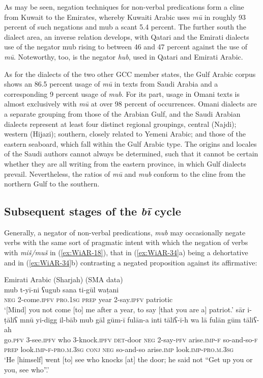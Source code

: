 \documentclass[output=paper]{langsci/langscibook}
\begin{document}
As may be seen, negation techniques for non-verbal predications form a cline from Kuwait to the Emirates, whereby Kuwaiti Arabic uses \textit{mū} in roughly 93 percent of such negations and mub a scant 5.4 percent. The further south the dialect area, an inverse relation develops, with Qatari and the Emirati dialects use of the negator mub rising to between 46 and 47 percent against the use of \textit{mū}. Noteworthy, too, is the negator \textit{hub}, used in Qatari and Emirati Arabic.

As for the dialects of the two other GCC member states, the Gulf Arabic corpus shows an 86.5 percent usage of \textit{mū} in texts from Saudi Arabia and a corresponding 9 percent usage of \textit{mub}. For its part, usage in Omani texts is almost exclusively with \textit{mū} at over 98 percent of occurrences. Omani dialects are a separate grouping from those of the Arabian Gulf, and the Saudi Arabian dialects represent at least four distinct regional groupings, central (Najdi); western (Hijazi); southern, closely related to Yemeni Arabic; and those of the eastern seaboard, which fall within the Gulf Arabic type. The origins and locales of the Saudi authors cannot always be determined, such that it cannot be certain whether they are all writing from the eastern province, in which Gulf dialects prevail. Nevertheless, the ratios of \textit{mū} and \textit{mub} conform to the cline from the northern Gulf to the southern.

\subsection{Subsequent stages of the \textit{bī} cycle} \label{s:WiAR-4.6}

Generally, a negator of non-verbal predications, \textit{mub} may occasionally negate verbs with the same sort of pragmatic intent with which the negation of verbs with \textit{miš/muš} in (\ref{ex:WiAR-18}), that in (\ref{ex:WiAR-34}a) being a dehortative and in (\ref{ex:WiAR-34}b) contrasting a negated proposition against its affirmative:

\ea Emirati Arabic (Sharjah) (SMA data)\label{ex:WiAR-34}\\
  \ea
	\gll mub t-yī-ni ʕugub sana ti-gūl waṭani\\
	\textsc{neg} 2-come.\textsc{ipfv} \textsc{pro.1sg} \textsc{prep} year 2-say.\textsc{ipfv} patriotic\\
  	\glt ‘[Mind] you not come [to] me after a year, to say [that you are a] patriot.’
  \ex
  	\gll sār i-ṭāliʕ mnū yi-digg il-bāb mub gāl gūm-ī fulān-a inti tāliʕ-ī-h wa lā fulān gūm tāliʕ-ah\\
  	go.\textsc{pfv} 3-see.\textsc{ipfv} who 3-knock.\textsc{ipfv} \textsc{det}-door \textsc{neg} 2-say-\textsc{pfv} arise.\textsc{imp-f} so-and-so-\textsc{f} \textsc{prep} look.\textsc{imp-f-pro.m.3sg} \textsc{conj} \textsc{neg} so-and-so arise.\textsc{imp} look.\textsc{imp-pro.m.3sg}\\
  	\glt ‘He [himself] went [to] see who knocks [at] the door; he said not “Get up you or you, see who”.’
\z \z
\end{document}
